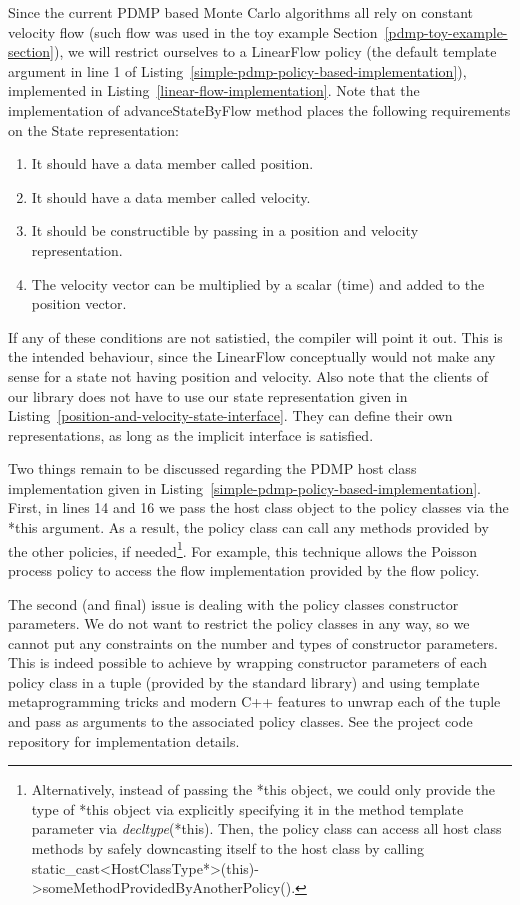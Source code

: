 \documentclass[report.tex]{subfiles}
\begin{document}
Since the current PDMP based Monte Carlo algorithms all rely on constant velocity
flow (such flow was used in the toy example Section~\ref{pdmp-toy-example-section}), we
will restrict ourselves to a LinearFlow policy (the default template argument in line 1
of Listing~\ref{simple-pdmp-policy-based-implementation}), implemented in
Listing~\ref{linear-flow-implementation}.
Note that the implementation of advanceStateByFlow method places the following
requirements on the State representation:
\begin{enumerate}
  \item It should have a data member called position.
  \item It should have a data member called velocity.
  \item It should be constructible by passing in a position and velocity representation.
  \item The velocity vector can be multiplied by a scalar (time) and added to the position vector.
\end{enumerate}
If any of these conditions are not satistied, the compiler will point it out. This is the
intended behaviour, since the LinearFlow conceptually would not make any sense for
a state not having position and velocity.
Also note that the clients of our library does not have to use our state representation
given in Listing~\ref{position-and-velocity-state-interface}.
They can define their own representations, as long as the implicit interface is satisfied.


Two things remain to be discussed regarding the PDMP host class implementation given
in Listing~\ref{simple-pdmp-policy-based-implementation}.
First, in lines 14 and 16 we pass the host class object to the policy classes
via the *this argument. As a result, the policy class can call any methods provided
by the other policies, if needed\footnote{
  Alternatively, instead of passing the *this object, we could only provide the type
  of *this object via explicitly specifying it in the method template
  parameter via \textit{decltype}(*this).
  Then, the policy class can access all host class methods by safely downcasting itself
  to the host class by calling static\_cast<HostClassType*>(this)->someMethodProvidedByAnotherPolicy().
}. For example, this technique allows the Poisson process
policy to access the flow implementation provided by the flow policy.

The second (and final) issue is dealing with the policy classes constructor parameters.
We do not want to restrict the policy classes in any way, so we cannot put any constraints
on the number and types of constructor parameters.
This is indeed possible to achieve by wrapping constructor parameters of each
policy class in a tuple (provided by the standard library)
and using template metaprogramming tricks and modern C++ features to unwrap
each of the tuple and pass as arguments to the associated policy classes.
See the project code repository for implementation details.
\end{document}
